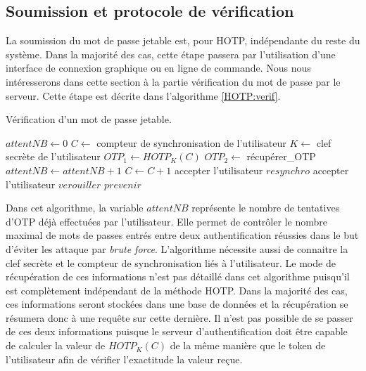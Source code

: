 \documentclass{../res/univ-projet}
\begin{document}
  \subsection{Soumission et protocole de vérification}
  La soumission du mot de passe jetable est, pour HOTP, indépendante du reste du système. Dans la majorité des cas, cette étape passera par l'utilisation d'une interface 
  de connexion graphique ou en ligne de commande. Nous nous intéresserons dans cette section à la partie vérification du mot de passe par le serveur. Cette étape est 
  décrite dans l'algorithme \ref{HOTP:verif}.  
  \begin{algorithm}
    \caption{Vérification d'un mot de passe jetable.}
    \label{HOTP:verif}
    
    \begin{algorithmic}
      \STATE $attentNB \leftarrow 0$
      \STATE $C \leftarrow$ compteur de synchronisation de l'utilisateur
      \STATE $K \leftarrow$ clef secrète de l'utilisateur
      \STATE $OTP_1 \leftarrow HOTP_K(C)$
	\STATE $OTP_2 \leftarrow$ récupérer\_OTP
	\STATE $attentNB \leftarrow attentNB + 1$
	  \STATE $C \leftarrow C + 1$
	  \STATE accepter l'utilisateur
	\ELSE
	    \STATE $resynchro$
	    \STATE accepter l'utilisateur
	  \ENDIF
	\ENDIF
      \ENDWHILE
      \STATE $verouiller$
      \STATE $prevenir$
    \end{algorithmic}
  \end{algorithm}
  
  Dans cet algorithme, la variable $attentNB$ représente le nombre de tentatives d'OTP déjà effectuées par l'utilisateur. Elle permet de contrôler le nombre maximal de mots 
  de passes entrés entre deux authentification réussies dans le but d'éviter les attaque par \emph{brute force}.
  L'algorithme nécessite aussi de connaitre la clef secrète et le compteur de synchronisation liés à l'utilisateur. Le mode de récupération de ces informations n'est pas 
  détaillé dans cet algorithme puisqu'il est complètement indépendant de la méthode HOTP. Dans la majorité des cas, ces informations seront stockées dans une base de 
  données et la récupération se résumera donc à une requête sur cette dernière. Il n'est pas possible de se passer de ces deux informations puisque le serveur 
  d'authentification doit être capable de calculer la valeur de $HOTP_K(C)$ de la même manière que le token de l'utilisateur afin de vérifier l'exactitude la valeur 
  reçue.
  
\end{document}
